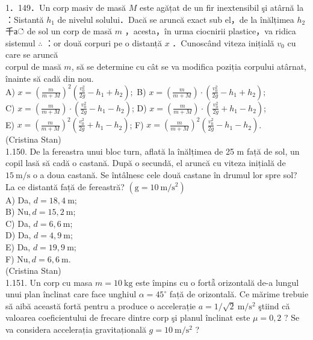 \documentclass[10pt]{article}
\begin{document}
1．149．Un corp masiv de masă $M$ este agățat de un fir inextensibil şi atârnă la ：Sistantă $h_{1}$ de nivelul solului．Dacă se aruncă exact sub el，de la înălțimea $h_{2}$千а் de sol un corp de masă $m$ ，acesta，în urma ciocnirii plastice，va ridica sistemul $\therefore$ ：or două corpuri pe o distanță $x$ ．Cunoscând viteza inițială $v_{0}$ cu care se aruncă\\
corpul de masă $m$, să se determine cu cât se va modifica poziția corpului atârnat, înainte să cadă din nou.\\
A) $x=\left(\frac{m}{m+M}\right)^{2}\left(\frac{v_{0}^{2}}{2 g}-h_{1}+h_{2}\right) ;$ B) $x=\left(\frac{m}{m+M}\right) \cdot\left(\frac{v_{0}^{2}}{2 g}-h_{1}+h_{2}\right) ;$\\
C) $x=\left(\frac{m}{m+M}\right) \cdot\left(\frac{v_{0}^{2}}{2 g}-h_{1}-h_{2}\right)$; D) $x=\left(\frac{m}{m+M}\right) \cdot\left(\frac{v_{0}^{2}}{2 g}+h_{1}-h_{2}\right)$;\\
E) $x=\left(\frac{m}{m+M}\right)^{2}\left(\frac{v_{0}^{2}}{2 g}+h_{1}-h_{2}\right)$; F) $x=\left(\frac{m}{m+M}\right)^{2}\left(\frac{v_{0}^{2}}{2 g}-h_{1}-h_{2}\right)$.\\
(Cristina Stan)\\
1.150. De la fereastra unui bloc turn, aflată la înălțimea de 25 m față de sol, un copil lasă să cadă o castană. După o secundă, el aruncă cu viteza inițială de $15 \mathrm{~m} / \mathrm{s}$ o a doua castană. Se întâlnesc cele două castane în drumul lor spre sol? La ce distantă față de fereastră? $\left(\mathrm{g}=10 \mathrm{~m} / \mathrm{s}^{2}\right)$\\
A) Da, $d=18,4 \mathrm{~m}$;\\
B) $\mathrm{Nu}, d=15,2 \mathrm{~m}$;\\
C) Da, $d=6,6 \mathrm{~m}$;\\
D) Da, $d=4,9 \mathrm{~m}$;\\
E) Da, $d=19,9 \mathrm{~m}$;\\
F) $\mathrm{Nu}, d=6,6 \mathrm{~m}$.\\
(Cristina Stan)\\
1.151. Un corp cu masa $m=10 \mathrm{~kg}$ este împins cu o fortẵ orizontală de-a lungul unui plan înclinat care face unghiul $\alpha=45^{\circ}$ față de orizontală. Ce mărime trebuie să aibă această fortă pentru a produce o accelerație $a=1 / \sqrt{2} \mathrm{~m} / \mathrm{s}^{2}$ ştiind că valoarea coeficientului de frecare dintre corp şi planul înclinat este $\mu=0,2$ ? Se va considera accelerația gravitațională $g=10 \mathrm{~m} / \mathrm{s}^{2}$ ?\\
\end{document}
